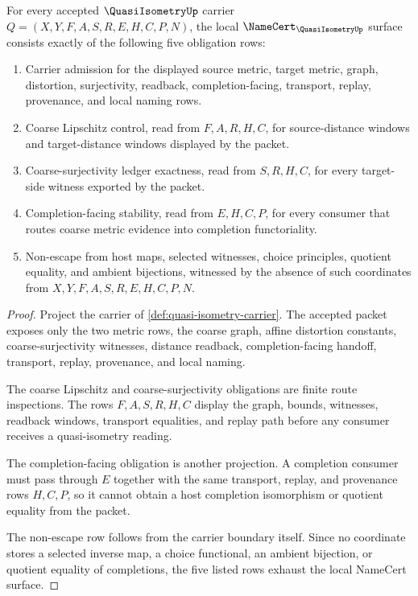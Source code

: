 \begin{theorem}
\label{thm:quasi-isometry-namecert-obligations}
For every accepted $\QuasiIsometryUp$ carrier $Q=(X,Y,F,A,S,R,E,H,C,P,N)$, the local $\NameCert_{\QuasiIsometryUp}$ surface consists exactly of the following five obligation rows:
\begin{enumerate}
\item Carrier admission for the displayed source metric, target metric, graph, distortion, surjectivity, readback, completion-facing, transport, replay, provenance, and local naming rows.
\item Coarse Lipschitz control, read from $F,A,R,H,C$, for source-distance windows and target-distance windows displayed by the packet.
\item Coarse-surjectivity ledger exactness, read from $S,R,H,C$, for every target-side witness exported by the packet.
\item Completion-facing stability, read from $E,H,C,P$, for every consumer that routes coarse metric evidence into completion functoriality.
\item Non-escape from host maps, selected witnesses, choice principles, quotient equality, and ambient bijections, witnessed by the absence of such coordinates from $X,Y,F,A,S,R,E,H,C,P,N$.
\end{enumerate}
\end{theorem}
\begin{proof}
Project the carrier of \autoref{def:quasi-isometry-carrier}. The accepted packet exposes only the two metric rows, the coarse graph, affine distortion constants, coarse-surjectivity witnesses, distance readback, completion-facing handoff, transport, replay, provenance, and local naming.

The coarse Lipschitz and coarse-surjectivity obligations are finite route inspections. The rows $F,A,S,R,H,C$ display the graph, bounds, witnesses, readback windows, transport equalities, and replay path before any consumer receives a quasi-isometry reading.

The completion-facing obligation is another projection. A completion consumer must pass through $E$ together with the same transport, replay, and provenance rows $H,C,P$, so it cannot obtain a host completion isomorphism or quotient equality from the packet.

The non-escape row follows from the carrier boundary itself. Since no coordinate stores a selected inverse map, a choice functional, an ambient bijection, or quotient equality of completions, the five listed rows exhaust the local NameCert surface.
\end{proof}

